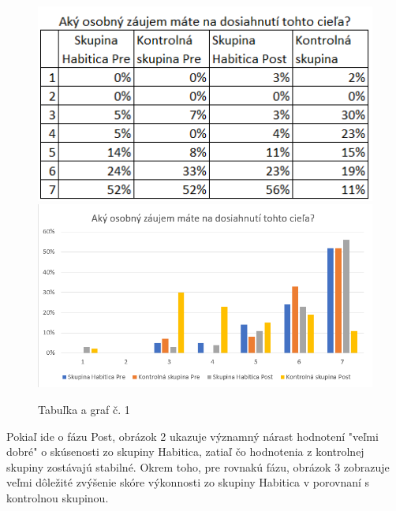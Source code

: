 \documentclass[10pt,twoside,slovak,a4paper]{article}
\begin{document}
\begin{figure}[h]
\caption{Tabuľka a graf č. 1}
\includegraphics[scale=0.85]{zaujemTable.png}
\includegraphics[scale=0.5]{zaujem.png}
\centering
\end{figure}

Pokiaľ ide o fázu Post, obrázok 2 ukazuje významný nárast hodnotení "veľmi dobré" 
o skúsenosti zo skupiny Habitica, zatiaľ čo hodnotenia z kontrolnej skupiny zostávajú stabilné. 
Okrem toho, pre rovnakú fázu, obrázok 3 zobrazuje veľmi dôležité zvýšenie skóre 
výkonnosti zo skupiny Habitica v porovnaní s kontrolnou skupinou.\cite{StudyOnPotentialOfVideogames}
\end{document}
